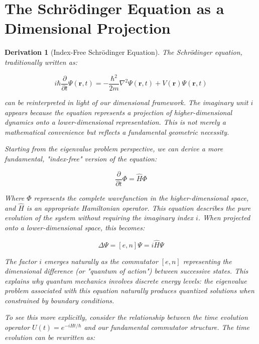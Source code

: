 \documentclass{article}
\newtheorem{derivation}{Derivation}
\begin{document}
\section{The Schrödinger Equation as a Dimensional Projection}

\begin{derivation}[Index-Free Schrödinger Equation]
The Schrödinger equation, traditionally written as:

\begin{equation}
i\hbar\frac{\partial}{\partial t}\Psi(\mathbf{r},t) = -\frac{\hbar^2}{2m}\nabla^2\Psi(\mathbf{r},t) + V(\mathbf{r})\Psi(\mathbf{r},t)
\end{equation}

can be reinterpreted in light of our dimensional framework. The imaginary unit $i$ appears because the equation represents a projection of higher-dimensional dynamics onto a lower-dimensional representation. This is not merely a mathematical convenience but reflects a fundamental geometric necessity.

Starting from the eigenvalue problem perspective, we can derive a more fundamental, "index-free" version of the equation:

\begin{equation}
\frac{\partial}{\partial t}\Phi = \hat{H}\Phi
\end{equation}

Where $\Phi$ represents the complete wavefunction in the higher-dimensional space, and $\hat{H}$ is an appropriate Hamiltonian operator. This equation describes the pure evolution of the system without requiring the imaginary index $i$. When projected onto a lower-dimensional space, this becomes:

\begin{equation}
\Delta\Psi = [e, n]\Psi = i\hat{H}\Psi
\end{equation}

The factor $i$ emerges naturally as the commutator $[e, n]$ representing the dimensional difference (or "quantum of action") between successive states. This explains why quantum mechanics involves discrete energy levels: the eigenvalue problem associated with this equation naturally produces quantized solutions when constrained by boundary conditions.

To see this more explicitly, consider the relationship between the time evolution operator $U(t) = e^{-iHt/\hbar}$ and our fundamental commutator structure. The time evolution can be rewritten as:


\end{derivation}
\end{document}
